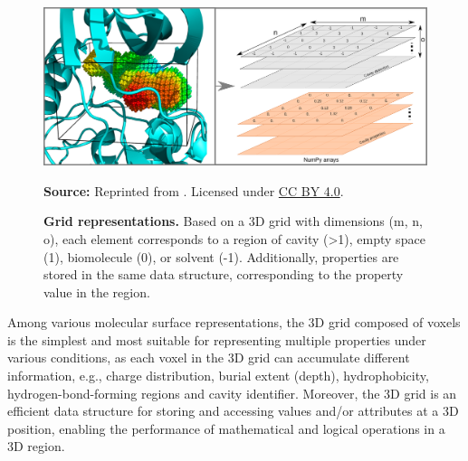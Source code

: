 \documentclass[Ingles]{phdthesis}
\def\eg{e.g.\onedot}
\begin{document}
\begin{figure}[ht]
  \centerline{\includegraphics[scale=1]{images/voxels.png}}
  \centerline{\tiny{\textbf{Source:} Reprinted from \cite{guerra2021}. Licensed under \href{https://creativecommons.org/licenses/by/4.0/}{CC BY 4.0}.}}
  \caption[Grid representations]{\textbf{Grid representations.} Based on a 3D grid with dimensions (m, n, o), each element corresponds to a region of cavity (>1), empty space (1), biomolecule (0), or solvent (-1). Additionally, properties are stored in the same data structure, corresponding to the property value in the region.}
  \label{fig:voxel}
\end{figure}

Among various molecular surface representations, the 3D grid composed of voxels is the simplest and most suitable for representing multiple properties under various conditions, as each voxel in the 3D grid can accumulate different information, \eg, charge distribution, burial extent (depth), hydrophobicity, hydrogen-bond-forming regions and cavity identifier. Moreover, the 3D grid is an efficient data structure for storing and accessing values and/or attributes at a 3D position, enabling the performance of mathematical and logical operations in a 3D region.


\end{document}
